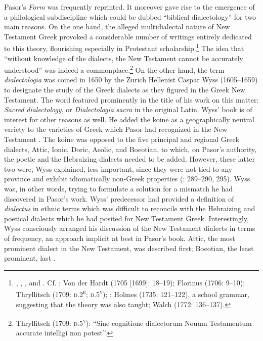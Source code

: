 Pasor’s \textit{Form} was frequently reprinted. It moreover gave rise to the emergence of a philological subdiscipline which could be dubbed “biblical dialectology” for two main reasons. On the one hand, the alleged multidialectal nature of New Testament Greek provoked a considerable number of writings entirely dedicated to this theory, flourishing especially in Protestant scholarship.\footnote{\citet{Wyss1650}, \citet{Olearius1668}, \citet{Leusden1670}, and \citet{Nibbe1755}. Cf. \citet[347]{Parr1686}; Von der Hardt (1705 [1699]: 18–19); Florinus (1706: 9–10); Thryllitsch (1709: \textsc{d.2}\textsc{\textsuperscript{r}}; \textsc{d.5}\textsc{\textsuperscript{v}}); \citet[18]{Reinhard1724}; Holmes (1735: 121–122), a school grammar, suggesting that the theory was also taught; Walch (1772: 136–137).} The idea that “without knowledge of the dialects, the New Testament cannot be accurately understood” was indeed a commonplace.\footnote{Thryllitsch (1709: \textsc{d.5}\textsc{\textsuperscript{v}}): “Sine cognitione dialectorum Nouum Testamentum accurate intelligi non potest”.} On the other hand, the term \textit{dialectologia} was coined in 1650 by the Zurich Hellenist Caspar Wyss (1605–1659) to designate the study of the Greek dialects as they figured in the Greek New Testament. The word featured prominently in the title of his work on this matter: \textit{Sacred} \textit{dialectology}, or \textit{Dialectologia} \textit{sacra} in the original Latin. Wyss’ book is of interest for other reasons as well. He added the koine as a geographically neutral variety to the varieties of Greek which Pasor had recognized in the New Testament \citep[3]{Wyss1650}. The koine was opposed to the five principal and regional Greek dialects, Attic, Ionic, Doric, Aeolic, and Boeotian, to which, on Pasor’s authority, the poetic and the Hebraizing dialects needed to be added. However, these latter two were, Wyss explained, less important, since they were not tied to any province and exhibit idiomatically non-Greek properties (\citealt{Wyss1650}: 289–290, 295). Wyss was, in other words, trying to formulate a solution for a mismatch he had discovered in Pasor’s work. Wyss’ predecessor had provided a definition of \textit{dialectus} in ethnic terms which was difficult to reconcile with the Hebraizing and poetical dialects which he had posited for New Testament Greek. Interestingly, Wyss consciously arranged his discussion of the New Testament dialects in terms of frequency, an approach implicit at best in Pasor’s book. Attic, the most prominent dialect in the New Testament, was described first; Boeotian, the least prominent, last \citep[4]{Wyss1650}.

